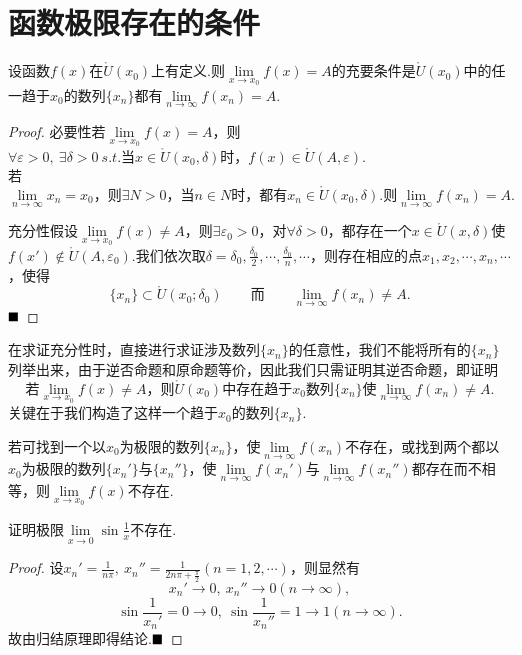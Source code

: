 \section{函数极限存在的条件}
\begin{theorem}[Heine归结原理]
	设函数$f(x)$在$\mathring{U}(x_0)$上有定义.则$\lim\limits_{x\to x_0}f(x)=A$的充要条件是$\mathring{U}(x_0)$中的任一趋于$x_0$的数列$\{x_n\}$都有$\lim\limits_{n\to \infty}f(x_n)=A$.
\end{theorem}
\begin{proof}
	必要性\qquad 若$\lim\limits_{x\to x_0}f(x)=A$，则$\forall \varepsilon>0,\ \exists\delta>0\ s.t.\text{当}x\in \mathring{U}(x_0,\delta)\text{时，}f(x)\in \mathring{U}(A,\varepsilon)$.\\
	若$\lim\limits_{n\to\infty}x_n=x_0\text{，则}\exists N>0\text{，当}n\in N\text{时，都有}x_n\in \mathring{U}(x_0,\delta).\text{则}\lim\limits_{n\to\infty}f(x_n)=A.$
	
	充分性\qquad 假设$\lim\limits_{x\to x_0}f(x)\neq A$，则$\exists \varepsilon_0>0$，对$\forall\delta>0$，都存在一个$x\in \mathring{U}(x,\delta)$使$f(x')\notin \mathring{U}(A,\varepsilon_0)$.我们依次取$\delta=\delta_0,\frac{\delta_0}{2},\cdots,\frac{\delta_0}{n},\cdots$，则存在相应的点$x_1,x_2,\cdots,x_n,\cdots$，使得
	$$\{x_n\}\subset\mathring{U}(x_0;\delta_0)\qquad\text{而}\qquad\lim\limits_{n\to\infty}f(x_n)\neq A.$$
	$\hfill\blacksquare$
\end{proof}
\begin{remark}
	在求证充分性时，直接进行求证涉及数列$\{x_n\}$的任意性，我们不能将所有的$\{x_n\}$列举出来，由于逆否命题和原命题等价，因此我们只需证明其逆否命题，即证明
	$$\text{若}\lim\limits_{x\to x_0}f(x)\neq A\text{，则}\mathring{U}(x_0)\text{中存在趋于}x_0\text{数列}\{x_n\}\text{使}\lim\limits_{n\to\infty}f(x_n)\neq A.$$
	关键在于我们构造了这样一个趋于$x_0$的数列$\{x_n\}$.
\end{remark}
\begin{remark}
	若可找到一个以$x_0$为极限的数列$\{x_n\}$，使$\lim\limits_{n\to \infty}f(x_n)$不存在，或找到两个都以$x_0$为极限的数列$\{x_n'\}$与$\{x_n''\}$，使$\lim\limits_{n\to\infty}f(x_n')$与$\lim\limits_{n\to\infty}f(x_n'')$都存在而不相等，则$\lim\limits_{x\to x_0}f(x)$不存在.
\end{remark}
\begin{example}
	证明极限$\lim\limits_{x\to 0}\sin\frac{1}{x}$不存在.
\end{example}
\begin{proof}
	设$x_n'=\frac{1}{n\pi},\ x_n''=\frac{1}{2n\pi+\frac{\pi}{2}}(n=1,2,\cdots)$，则显然有
	$$x_n'\to 0,\ x_n''\to 0(n\to \infty),$$
	$$\sin\frac{1}{x_n'}=0\to 0,\ \sin\frac{1}{x_n''}=1\to 1(n\to \infty).$$
	故由归结原理即得结论.$\hfill\blacksquare$
\end{proof}
